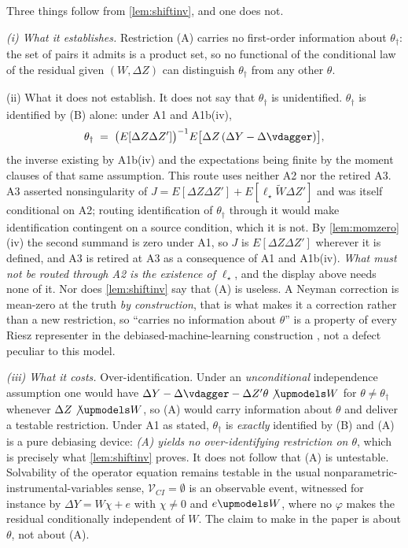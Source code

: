 \begin{remark}[R1]\label{rem:R1}
Three things follow from \cref{lem:shiftinv}, and one does not.

\emph{(i) What it establishes.} Restriction (A) carries no first-order information about
$\theta_\dagger$: the set of pairs it admits is a product set, so no functional of the conditional law
of the residual given $(W,\Delta Z)$ can distinguish $\theta_\dagger$ from any other $\theta$.

(ii) What it does not establish. It does not say that $\theta_\dagger$ is unidentified.
$\theta_\dagger$ is identified by (B) alone: under A1 and A1b(iv),
\[
\theta_\dagger\;=\;\big(E[\Delta Z\Delta Z']\big)^{-1}E\big[\Delta Z\,(\Delta Y-\Delta\vdagger)\big],
\]
the inverse existing by A1b(iv) and the expectations being finite by the moment clauses of that same
assumption. This route uses neither A2 nor the retired A3. A3 asserted nonsingularity of
$J=E[\Delta Z\Delta Z']+E[\ell_\star\widetilde W\Delta Z']$ and was itself conditional on A2; routing
identification of $\theta_\dagger$ through it would make identification contingent on a source condition,
which it is not. By \cref{lem:momzero}\textup{(iv)} the second summand is zero under A1, so $J$ is
$E[\Delta Z\Delta Z']$ wherever it is defined, and A3 is retired at A3 as a consequence of
A1 and A1b(iv). \emph{What must not be routed through A2 is the existence of $\ell_\star$}, and the
display above needs none of it. Nor does \cref{lem:shiftinv} say that
(A) is useless. A Neyman correction is mean-zero at the truth \emph{by construction}, that is what
makes it a correction rather than a new restriction, so ``carries no information about $\theta$'' is a
property of every Riesz representer in the debiased-machine-learning construction
\citep{chernozhukov2018dml}, not a defect peculiar to this model.

\emph{(iii) What it costs.} Over-identification. Under an \emph{unconditional} independence assumption
one would have $\Delta Y-\Delta\vdagger-\Delta Z'\theta\not\upmodels W$ for $\theta\ne\theta_\dagger$
whenever $\Delta Z\not\upmodels W$, so (A) would carry information about $\theta$ and deliver a testable
restriction. Under A1 as stated, $\theta_\dagger$ is \emph{exactly} identified by (B) and (A) is a pure
debiasing device: \emph{(A) yields no over-identifying restriction on $\theta$}, which is precisely what
\cref{lem:shiftinv} proves. It does not follow that (A) is untestable. Solvability of the operator
equation remains testable in the usual nonparametric-instrumental-variables sense, $\mathcal V_{CI}=\emptyset$
is an observable event, witnessed for instance by $\Delta Y=W\chi+e$ with $\chi\ne0$ and $e\upmodels W$,
where no $\varphi$ makes the residual conditionally independent of $W$. The claim to make in the paper is
about $\theta$, not about (A).


\end{remark}
